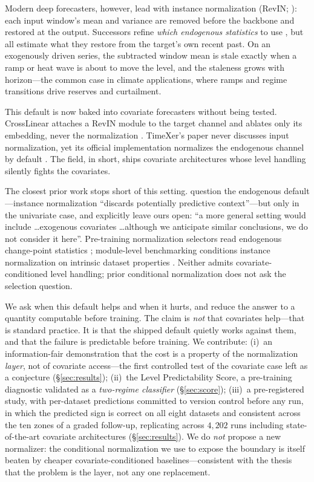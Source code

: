 \documentclass{article}
\begin{document}
Modern deep forecasters, however, lead with instance normalization (RevIN;
\citealp{kim2022revin}): each input window's mean and variance are removed
before the backbone and restored at the output. Successors refine \emph{which
endogenous statistics} to use \citep{liu2023san,ye2024fan,fan2023dishts}, but
all estimate what they restore from the target's own recent past. On an
exogenously driven series, the subtracted window mean is stale exactly when a
ramp or heat wave is about to move the level, and the staleness grows with
horizon---the common case in climate applications, where ramps and regime
transitions drive reserves and curtailment.

This default is now baked into covariate forecasters without being tested.
CrossLinear attaches a RevIN module to the target channel and ablates only its
embedding, never the normalization \citep{crosslinear2025}. TimeXer's paper
never discusses input normalization, yet its official implementation normalizes
the endogenous channel by default \citep{wang2024timexer}. The field, in short,
ships covariate architectures whose level handling silently fights the
covariates.

The closest prior work stops short of this setting. \citet{role2026revin}
question the endogenous default---instance normalization ``discards potentially
predictive context''---but only in the univariate case, and explicitly leave
ours open: ``a more general setting would include \ldots exogenous covariates
\ldots although we anticipate similar conclusions, we do not consider it
here''. Pre-training normalization selectors read endogenous change-point
statistics \citep{noise2025signal}; module-level benchmarking conditions
instance normalization on intrinsic dataset properties
\citep{timerecipe2025}. Neither admits covariate-conditioned level handling;
prior conditional normalization
\citep{gamakumara2023conditional} does not ask the selection question.

We ask when this default helps and when it hurts, and reduce the answer to a
quantity computable before training. The claim is \emph{not} that covariates
help---that is standard practice. It is that the shipped default quietly works
against them, and that the failure is predictable before training. We
contribute: (i)~an information-fair demonstration that the cost is a property
of the normalization \emph{layer}, not of covariate access---the first
controlled test of the covariate case \citet{role2026revin} left as a
conjecture (\S\ref{sec:results}); (ii)~the Level Predictability Score, a
pre-training diagnostic validated as a \emph{two-regime classifier}
(\S\ref{sec:score}); (iii)~a pre-registered study, with per-dataset predictions
committed to version control before any run, in which the predicted sign is
correct on all eight datasets and consistent across the ten zones of a graded
follow-up, replicating across $4{,}202$ runs including state-of-the-art
covariate architectures (\S\ref{sec:results}). We do \emph{not} propose a new
normalizer: the conditional normalization we use to expose the boundary is
itself beaten by cheaper covariate-conditioned baselines---consistent with the
thesis that the problem is the layer, not any one replacement.
\end{document}
